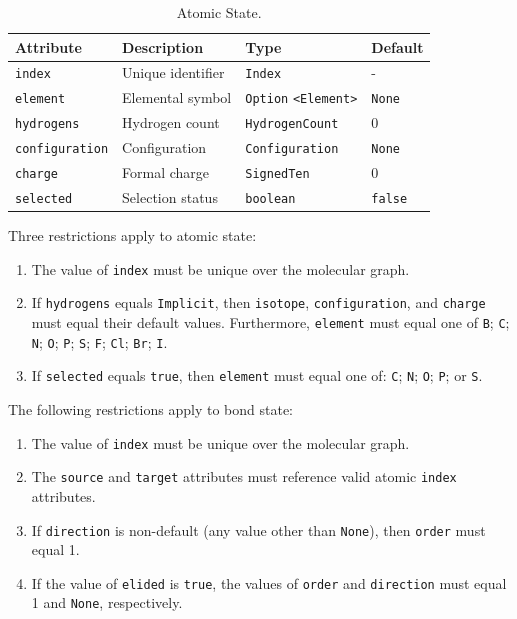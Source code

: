 \documentclass{article}
\def\ttt{\texttt}
\begin{document}
\begin{table}
\caption{Atomic State.}
\centering
\begin{tabular}{l L L l}
    \hline
    Attribute & Description & Type & Default \\
    \hline
    \ttt{index} & Unique identifier &\ttt{Index} & - \\
    \ttt{element} & Elemental symbol & \ttt{Option} \ttt{<Element>} & \ttt{None} \\
    \ttt{hydrogens} & Hydrogen count & \ttt{HydrogenCount} & 0 \\
    \ttt{configuration} & Configuration & \ttt{Configuration} & \ttt{None} \\
    \ttt{charge} & Formal charge & \ttt{SignedTen} & 0 \\
    \ttt{selected} & Selection status & \ttt{boolean} & \ttt{false} \\
    \hline
\end{tabular}
\label{table:atomic-state}
\end{table}

Three restrictions apply to atomic state:

\begin{enumerate}
    \item{The value of \ttt{index} must be unique over the molecular graph.}
    \item{If \ttt{hydrogens} equals \ttt{Implicit}, then \ttt{isotope}, \ttt{configuration}, and \ttt{charge} must equal their default values. Furthermore, \ttt{element} must equal one of \ttt{B}; \ttt{C}; \ttt{N}; \ttt{O}; \ttt{P}; \ttt{S}; \ttt{F}; \ttt{Cl}; \ttt{Br}; \ttt{I}.}
    \item{If \ttt{selected} equals \ttt{true}, then \ttt{element} must equal one of: \ttt{C}; \ttt{N}; \ttt{O}; \ttt{P}; or \ttt{S}.}
\end{enumerate}

The following restrictions apply to bond state:

\begin{enumerate}
    \item{The value of \ttt{index} must be unique over the molecular graph.}
    \item{The \ttt{source} and \ttt{target} attributes must reference valid atomic \ttt{index} attributes.}
    \item{If \ttt{direction} is non-default (any value other than \ttt{None}), then \ttt{order} must equal 1.}
    \item{If the value of \ttt{elided} is \ttt{true}, the values of \ttt{order} and \ttt{direction} must equal 1 and \ttt{None}, respectively.}
\end{enumerate}
\end{document}
